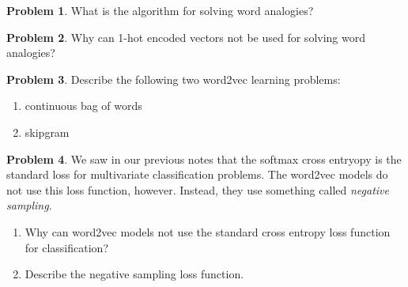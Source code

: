 \documentclass[10pt]{article}
\theoremstyle{definition}
\newtheorem{problem}{Problem}
\begin{document}
\newpage
\begin{problem}
    What is the algorithm for solving word analogies?
\end{problem}
\vspace{5in}

\begin{problem}
    Why can 1-hot encoded vectors not be used for solving word analogies?
\end{problem}

\newpage
\begin{problem}
    Describe the following two word2vec learning problems:
    \begin{enumerate}
        \item continuous bag of words
            \vspace{6in}
        \item skipgram
    \end{enumerate}
\end{problem}

\newpage
\begin{problem}
    We saw in our previous notes that the softmax cross entryopy is the standard loss for multivariate classification problems.
    The word2vec models do not use this loss function, however.
    Instead, they use something called \emph{negative sampling}.

    \begin{enumerate}
        \item
    Why can word2vec models not use the standard cross entropy loss function for classification?
\vspace{3in}

            \item
    Describe the negative sampling loss function.
    \end{enumerate}
\end{problem}

\end{document}
